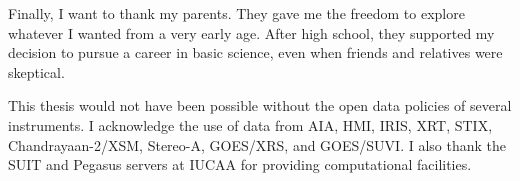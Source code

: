\noindent
Finally, I want to thank my parents. They gave me the freedom to explore whatever I wanted from a very early age. After high school, they supported my decision to pursue a career in basic science, even when friends and relatives were skeptical.  

\noindent
This thesis would not have been possible without the open data policies of several instruments. I acknowledge the use of data from AIA, HMI, IRIS, XRT, STIX, Chandrayaan-2/XSM, Stereo-A, GOES/XRS, and GOES/SUVI. I also thank the SUIT and Pegasus servers at IUCAA for providing computational facilities.
